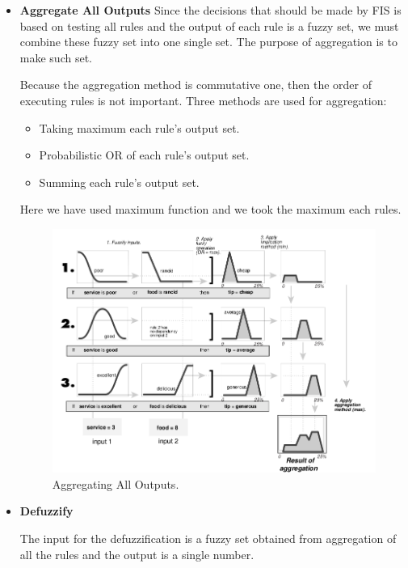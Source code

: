 \documentclass{article}
\begin{document}
\begin{itemize}
\item \textbf{Aggregate All Outputs}\label{aggregation}
Since the decisions that should be made by FIS is based on testing all rules and the output of each rule is a fuzzy set, we must combine these fuzzy set into one single set.
The purpose of aggregation is to make such set.


Because the aggregation method is commutative one, then the order of executing rules is not important.
Three methods are used for aggregation:
\begin{itemize}
\item Taking maximum each rule's output set.
\item Probabilistic OR of each rule's output set.
\item Summing each rule's output set.
\end{itemize}

Here we have used maximum function and we took the maximum each rules.
   
\begin{figure}[H]
\begin{center}
\includegraphics[scale=0.5]{./images/aggregating_all_outputs.png}
\caption{Aggregating All Outputs.}
\label{Aggregating All Outputs}
\end{center}
\end{figure}

\item \textbf{Defuzzify}

The input for the defuzzification is a fuzzy set obtained from aggregation of all the rules
and the output is a single number.


\end{itemize}
\end{document}
